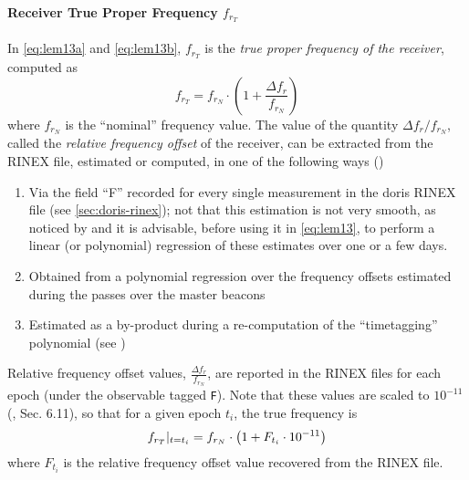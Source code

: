 \paragraph{Receiver True Proper Frequency $f_{r_T}$}\label{par:receiver-true-proper-frequency}
In \autoref{eq:lem13a} and \autoref{eq:lem13b}, $f_{r_T}$ is the \emph{true proper frequency of 
the receiver}, computed as
\begin{equation}\label{eq:frt-gen}
  f_{r_T} = f_{r_N} \cdot \left( 1 + \frac{\Delta f_r}{f_{r_N}} \right)
\end{equation}
where $f_{r_N}$ is the ``nominal'' frequency value. The value of the quantity 
$\Delta f_r / f_{r_N}$, called the \emph{relative frequency offset} of the receiver,
can be extracted from the RINEX file, estimated or computed, in one of the following 
ways (\cite{Lemoine2016})
\begin{enumerate}
    \item Via the field ``F'' recorded for every single measurement in the \gls{doris} 
      RINEX file (see \autoref{sec:doris-rinex}); not that this estimation 
      is not very smooth, as noticed by \cite{Gao2015} and it is advisable, before 
      using it in \autoref{eq:lem13}, to perform a linear (or polynomial) regression of 
      these estimates over one or a few days.
    \item Obtained from a polynomial regression over the frequency 
      offsets estimated during the passes over the master beacons
    \item Estimated as a by-product during a re-computation of the 
      ``timetagging'' polynomial (see \cite{Mercier2010})
\end{enumerate}

Relative frequency offset values, $\frac{\Delta f_r}{f_{r_N}}$, are reported in the RINEX files for each epoch 
(under the observable tagged \texttt{F}). Note that these values are scaled to 
$10^{-11}$ (\cite{DORISRNX3}, Sec. 6.11), so that for a given epoch $t_i$, the 
true frequency is
\begin{equation}\label{eq:frt-rinex}
  f_{r_T}|_{t=t_i} = f_{r_N} \cdot \left( 1 + F_{t_i} \cdot 10^{-11} \right)
\end{equation}
where $F_{t_i}$ is the relative frequency offset value recovered from the RINEX 
file.

